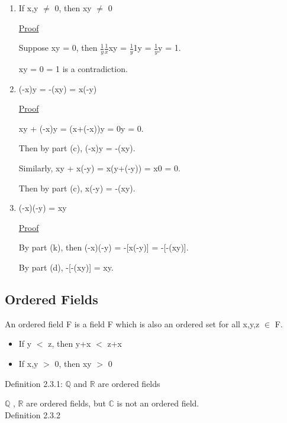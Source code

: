 \begin{enumerate}[label=(\alph*), leftmargin=2cm]
	\item If x,y $\not =$ 0, then xy $\not =$ 0

		{ \color{magenta} \underline{Proof} } 
		
		\qquad Suppose xy = 0, then $\frac{1}{y}\frac{1}{x}$xy = $\frac{1}{y}$1y =
				$\frac{1}{y}$y = 1.

		\qquad xy = 0 = 1 is a contradiction.
	
	\item (-x)y = -(xy) = x(-y)

		{ \color{magenta} \underline{Proof} } 
		
		\qquad xy + (-x)y = (x+(-x))y = 0y = 0.

		\qquad Then by part (c), (-x)y = -(xy).

		\qquad Similarly, xy + x(-y) = x(y+(-y)) = x0 = 0.
	
		\qquad Then by part (c), x(-y) = -(xy).
	
	\item (-x)(-y) = xy

		{ \color{magenta} \underline{Proof} } 
		
		\qquad By part (k), then (-x)(-y) = -[x(-y)] = -[-(xy)].

		\qquad By part (d), -[-(xy)] = xy.
\end{enumerate}





\subsection{Ordered Fields}

\qquad An ordered field F is a field F which is also an ordered set for all x,y,z $\in$ F.

\begin{itemize}[leftmargin=2cm]
	\item If y $<$ z, then y+x $<$ z+x
	
	\item If x,y $>$ 0, then xy $>$ 0
\end{itemize}

{ \color{blue} Definition 2.3.1: $ \mathbb{Q} $ and $ \mathbb{R} $ are ordered fields } 

\qquad $ \mathbb{Q} $ , $ \mathbb{R} $ are ordered fields, but $ \mathbb{C} $ is not an ordered field. \\

{ \color{blue} Definition 2.3.2} 

